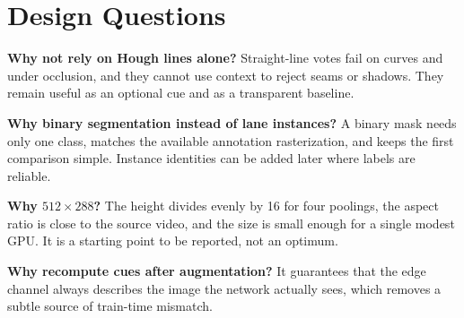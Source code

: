 \documentclass[10pt,a4paper,twocolumn]{article}
\begin{document}
\section{Design Questions}
\textbf{Why not rely on Hough lines alone?} Straight-line votes fail on curves and under occlusion, and they cannot use context to reject seams or shadows. They remain useful as an optional cue and as a transparent baseline.

\smallskip\noindent\textbf{Why binary segmentation instead of lane instances?} A binary mask needs only one class, matches the available annotation rasterization, and keeps the first comparison simple. Instance identities can be added later where labels are reliable.

\smallskip\noindent\textbf{Why $512\times288$?} The height divides evenly by 16 for four poolings, the aspect ratio is close to the source video, and the size is small enough for a single modest GPU. It is a starting point to be reported, not an optimum.

\smallskip\noindent\textbf{Why recompute cues after augmentation?} It guarantees that the edge channel always describes the image the network actually sees, which removes a subtle source of train-time mismatch.
\end{document}
